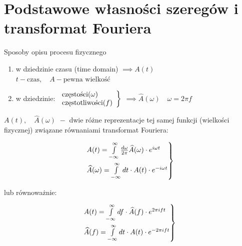\section{Podstawowe własności szeregów i transformat Fouriera}
\begin{frame}[allowframebreaks]{Sposoby opisu procesu fizycznego}
	\begin{enumerate}
		\item w dziedzinie czasu (time domain) $ \implies A(t) $ \\
		$ t - \text{czas}, \quad A - \text{pewna wielkość} $
		\item w dziedzinie: $
		\begin{rcases*}
		\begin{array}{l}
		\text{częstości} (\omega) \\ \text{częstotliwości} (f)
		\end{array}
		\end{rcases*}$
		$\implies \widehat{A}(\omega) \quad \omega = 2 \pi f$
	\end{enumerate}
	$A(t), \quad \widehat{A}(\omega) \,\, - $ dwie różne reprezentacje tej samej funkcji (wielkości fizycznej) związane równaniami transformat Fouriera:
	\begin{block}
	\centering
	\renewcommand{\arraystretch}{1.5}
	\setlength{\abovedisplayskip}{0pt}
	\setlength{\belowdisplayskip}{0pt}
	\setlength{\abovedisplayshortskip}{0pt}
	\setlength{\belowdisplayshortskip}{0pt}
	\[
	\begin{rcases*}
		A(t) = \int\limits_{-\infty}^{\infty}\frac{d \omega}{2\pi}\widehat{A}(\omega) \cdot e^{i \omega t} \\
		\widehat{A}(\omega) = \int\limits_{-\infty}^{\infty}dt \cdot A(t) \cdot e^{-i \omega t}
	\end{rcases*}
	\]
	\end{block}
	lub równoważnie:
	\begin{block}
	\centering
	\renewcommand{\arraystretch}{1.5}
	\setlength{\abovedisplayskip}{0pt}
	\setlength{\belowdisplayskip}{0pt}
	\setlength{\abovedisplayshortskip}{0pt}
	\setlength{\belowdisplayshortskip}{0pt}
	\[
	\begin{rcases*}
		A(t) = \int\limits_{-\infty}^{\infty}df \cdot \widehat{A}(f) \cdot e^{2 \pi ift} \\
		\widehat{A}(f) = \int\limits_{-\infty}^{\infty}dt \cdot A(t) \cdot e^{-2 \pi ift}
	\end{rcases*}
	\begin{array}{r}

\end{array}\]
\end{block}
\end{frame}

